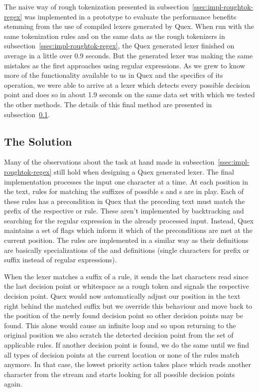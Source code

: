 The naive way of rough tokenization presented in
subsection~\ref{ssec:impl-roughtok-regex} was implemented in a prototype to
evaluate the performance benefits stemming from the use of compiled lexers
generated by Quex. When run with the same tokenization rules and on the same
data as the rough tokenizers in subsection~\ref{ssec:impl-roughtok-regex}, the
Quex generated lexer finished on average in a little over 0.9 seconds. But the
generated lexer was making the same mistakes as the first approaches using
regular expressions. As we grew to know more of the functionality available to
us in Quex and the specifics of its operation, we were able to arrive at a
lexer which detects every possible decision point and does so in about 1.9
seconds on the same data set with which we tested the other methods. The
details of this final method are presented in
subsection~\ref{ssec:impl-roughtok-solution}.

\subsection{The Solution}
\label{ssec:impl-roughtok-solution}

Many of the observations about the task at hand made in
subsection~\ref{ssec:impl-roughtok-regex} still hold when designing a Quex
generated lexer. The final implementation processes the input one character at
a time. At each position in the text, rules for matching the suffixes of
possible \maysplit{}s and \mayjoin{}s are in play. Each of these rules has a
precondition in Quex that the preceding text must match the prefix of the
respective \maysplit{} or \mayjoin{} rule. These aren't implemented by
backtracking and searching for the regular expression in the already processed
input. Instead, Quex maintains a set of flags which inform it which of the
preconditions are met at the current position. The \maybreaksentence{} rules
are implemented in a similar way as their definitions are basically
specializations of the \maysplit{} and \mayjoin{} definitions (single
characters for prefix or suffix instead of regular expressions).

When the lexer matches a suffix of a rule, it sends the last characters read
since the last decision point or whitespace as a rough token and signals the
respective decision point. Quex would now automatically adjust our position in
the text right behind the matched suffix but we override this behaviour and
move back to the position of the newly found decision point so other decision
points may be found. This alone would cause an infinite loop and so upon
returning to the original position we also scratch the detected decision point
from the set of applicable rules. If another decision point is found, we do the
same until we find all types of decision points at the current location or none
of the rules match anymore. In that case, the lowest priority action takes
place which reads another character from the stream and starts looking for all
possible decision points again.

